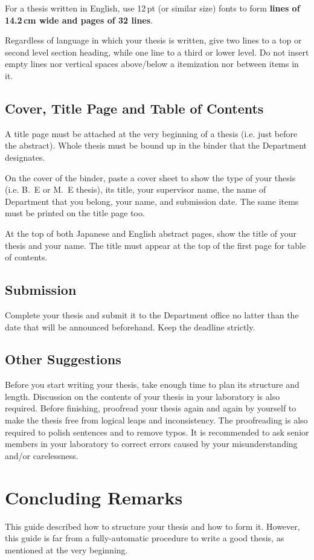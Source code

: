 \documentclass[master,english]{kuisthesis}
\let\EM\bf
\begin{document}
For a thesis written in English, use 12\,pt (or similar size) fonts to form
{\EM lines of 14.2\,cm wide and pages of 32 lines}.

Regardless of language in which your thesis is written, give two lines to a
top or second level section heading, while one line to a third or lower
level.  Do not insert empty lines nor vertical spaces above/below a
itemization nor between items in it.

\subsection{Cover, Title Page and Table of Contents}\label{subsec-title}
A title page must be attached at the very beginning of a thesis (i.e. just
before the abstract).  Whole thesis must be bound up in the binder that the
Department designates.

On the cover of the binder, paste a cover sheet to show the type of your
thesis (i.e. B.~E or M.~E thesis), its title, your supervisor name, the name
of Department that you belong, your name, and submission date.  The
same items must be printed on the title page too.

At the top of both Japanese and English abstract pages, show the title of
your thesis and your name.  The title must appear at the top of the first
page for table of contents.

\subsection{Submission}\label{subsec-submission}
Complete your thesis and submit it to the Department office no latter than
the date that will be announced beforehand.  Keep the deadline strictly.

\subsection{Other Suggestions}\label{subsec-others}
Before you start writing your thesis, take enough time to plan its structure
and length.  Discussion on the contents of your thesis in your laboratory is
also required.  Before finishing, proofread your thesis again and again by
yourself to make the thesis free from logical leaps and inconsistency.  The
proofreading is also required to polish sentences and to remove typos.  It
is recommended to ask senior members in your laboratory to correct errors
caused by your misunderstanding and/or carelessness.

\section{Concluding Remarks}\label{sec-conclusion}
This guide described how to structure your thesis and how to form it.
However, this guide is far from a fully-automatic procedure to write a good
thesis, as mentioned at the very beginning.
\end{document}
